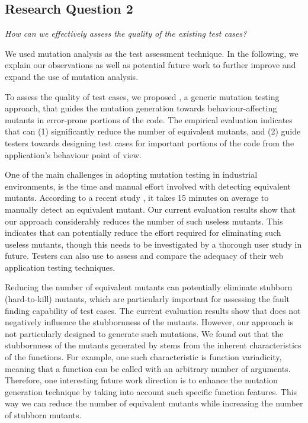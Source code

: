 \subsection{Research Question 2}

\emph{How can we effectively assess the quality of the existing \javascript test cases?}

We used mutation analysis as the test assessment technique. In the following, we explain our observations as well as potential future work to further improve and expand the use of mutation analysis. 

 To assess the quality of test cases, we proposed \mutandis, a generic mutation testing approach, that guides the mutation generation towards behaviour-affecting mutants in error-prone portions of the code. The empirical evaluation indicates that \mutandis can (1) significantly reduce the number of equivalent mutants, and (2) guide testers towards designing test cases for important portions of the code from the application's behaviour point of view. 

One of the main challenges in adopting mutation testing in industrial environments, is the time and manual effort involved with detecting equivalent mutants. According to a recent study \cite{madeyski:tse13}, it takes 15 minutes on average to manually detect an equivalent mutant. Our current evaluation results show that our approach considerably reduces the number of such useless mutants. This indicates that \mutandis can potentially reduce the effort required for eliminating such useless mutants, though this needs to be investigated by a thorough user study in future.
Testers can also use \mutandis to assess and compare the adequacy of their web application testing techniques.  

 Reducing the number of equivalent mutants can potentially eliminate stubborn (hard-to-kill) mutants, which are particularly important for assessing the fault finding capability of test cases. The current evaluation results show that \mutandis does not negatively influence the stubbornness of the mutants.
However, our approach is not particularly designed to generate such mutations.
We found out that the stubbornness of the mutants generated by \mutandis stems from the inherent characteristics of the \javascript functions. For example, one such characteristic is function variadicity, meaning that a function can be called with an arbitrary number of arguments. 
Therefore, one interesting future work direction is to enhance the mutation generation technique by taking into account such specific function features. This way we can reduce the number of equivalent mutants while increasing the number of stubborn mutants.

